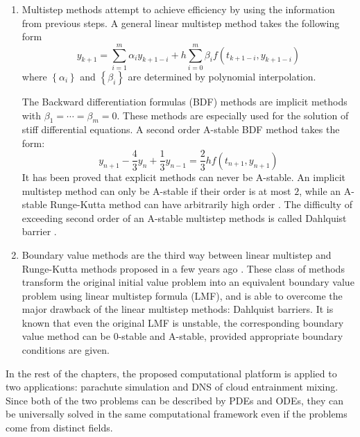 \begin{enumerate}
\item Multistep methods attempt to achieve efficiency by using the information from previous steps. A general linear multistep method takes the following form
\begin{equation}
y_{k+1}=\sum_{i=1}^{m}\alpha_{i}y_{k+1-i}+h\sum_{i=0}^{m}\beta_{i}f\left(t_{k+1-i},y_{k+1-i}\right)
\end{equation}
where $\left\{ \alpha_{i}\right\} $ and $\left\{ \beta_{i}\right\} $ are determined by polynomial interpolation.

The Backward differentiation formulas (BDF) methods are implicit methods with $\beta_1 = \cdots = \beta_m = 0$. These methods are especially used for the solution of stiff differential equations. A second order A-stable BDF method takes the form:
\begin{equation}
y_{n+1} - \frac{4}{3}y_{n} + \frac{1}{3}y_{n-1} = \frac{2}{3}hf(t_{n+1},y_{n+1})
\end{equation}
It has been proved that explicit methods can never be A-stable. An implicit multistep method can only be A-stable if their order is at most $2$, while an A-stable Runge-Kutta method can have arbitrarily high order \cite{Hairer1991Solving}. The difficulty of exceeding second order of an A-stable multistep methods is called Dahlquist barrier \cite{Dahlquist1963, Dahlquist1956}.

\item Boundary value methods are the third way between linear multistep and Runge-Kutta methods proposed in a few years ago \cite{Brugnano1998Boundary}. These class of methods transform the original initial value problem into an equivalent boundary value problem using linear multistep formula (LMF), and is able to overcome the major drawback of the linear multistep methods: Dahlquist barriers. It is known that even the original LMF is unstable, the corresponding boundary value method can be $0$-stable and A-stable, provided appropriate boundary conditions are given.
\end{enumerate}

In the rest of the chapters, the proposed computational platform is applied to two applications: parachute simulation and DNS of cloud entrainment mixing. Since both of the two problems can be described by PDEs and ODEs, they can be universally solved in the same computational framework even if the problems come from distinct fields.
